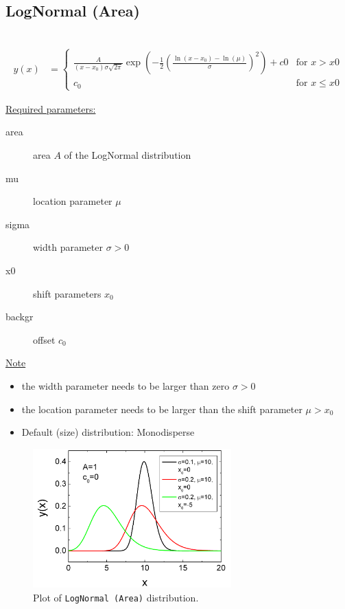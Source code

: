 \clearpage
\subsection{LogNormal (Area)} ~\\
\label{sec:LogNormalArea}
\begin{align}
y(x) &=
\begin{cases}
        \frac{A}{(x-x_0)\sigma \sqrt{2 \pi}}
        \exp\left(-\frac{1}{2}\left(\frac{\ln (x-x_0) -
        \ln(\mu)}{\sigma}\right)^2\right) + c0 & \mbox{for } x>x0 \\
        c_0 & \mbox{for } x \leq x0
\end{cases}
\end{align}

\uline{Required parameters:}
\begin{description}
    \item[area] area $A$ of the LogNormal distribution
    \item[mu] location parameter $\mu$
    \item[sigma] width parameter $\sigma > 0$
    \item[x0] shift parameters $x_0$
    \item[backgr] offset $c_0$
\end{description}

\uline{Note}
\begin{itemize}
  \item the width parameter needs to be larger than zero $\sigma > 0$
  \item the location parameter needs to be larger than the shift parameter $\mu > x_0$
  \item Default (size) distribution: Monodisperse
\end{itemize}

\begin{figure}[htb]
\begin{center}
\includegraphics[width=0.6824\textwidth]{LogNormalArea.png}
\end{center}
\caption{Plot of \texttt{LogNormal (Area)} distribution.}
\label{fig:LogNormalArea}
\end{figure}


